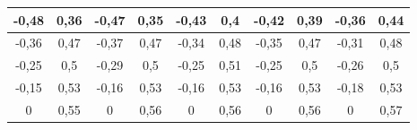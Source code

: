 \documentclass[a4paper, 12pt]{article}
\begin{document}
\begin{table}[H]
\begin{tabular}{|cc|cc|cc|cc|cc|}
	\multicolumn{1}{|c|}{-0,48}         & 0,36       & \multicolumn{1}{c|}{-0,47}         & 0,35       & \multicolumn{1}{c|}{-0,43}         & 0,4        & \multicolumn{1}{c|}{-0,42}         & 0,39       & \multicolumn{1}{c|}{-0,36}         & 0,44       \\ \hline
	\multicolumn{1}{|c|}{-0,36}         & 0,47       & \multicolumn{1}{c|}{-0,37}         & 0,47       & \multicolumn{1}{c|}{-0,34}         & 0,48       & \multicolumn{1}{c|}{-0,35}         & 0,47       & \multicolumn{1}{c|}{-0,31}         & 0,48       \\ \hline
	\multicolumn{1}{|c|}{-0,25}         & 0,5        & \multicolumn{1}{c|}{-0,29}         & 0,5        & \multicolumn{1}{c|}{-0,25}         & 0,51       & \multicolumn{1}{c|}{-0,25}         & 0,5        & \multicolumn{1}{c|}{-0,26}         & 0,5        \\ \hline
	\multicolumn{1}{|c|}{-0,15}         & 0,53       & \multicolumn{1}{c|}{-0,16}         & 0,53       & \multicolumn{1}{c|}{-0,16}         & 0,53       & \multicolumn{1}{c|}{-0,16}         & 0,53       & \multicolumn{1}{c|}{-0,18}         & 0,53       \\ \hline
	\multicolumn{1}{|c|}{0}             & 0,55       & \multicolumn{1}{c|}{0}             & 0,56       & \multicolumn{1}{c|}{0}             & 0,56       & \multicolumn{1}{c|}{0}             & 0,56       & \multicolumn{1}{c|}{0}             & 0,57       \\ \hline
	\end{tabular}
\end{table}
\end{document}
